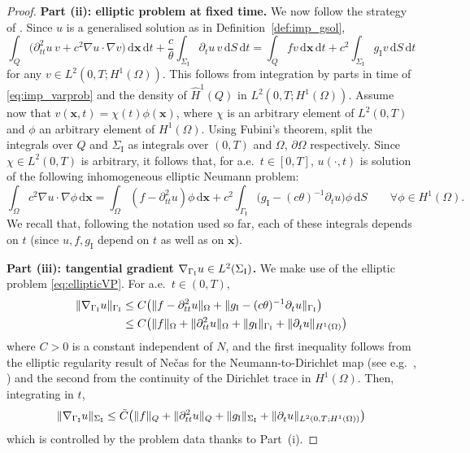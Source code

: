 \documentclass[a4paper]{article}
\theoremstyle{plain}
\theoremstyle{definition}
\newcommand{\dx}{{\,\mathrm{d}\vect x}}
\newcommand{\dt}{{\,\mathrm{d}t}}
\newcommand{\dS}{{\,\mathrm{d}S}}
\newcommand{\Grad}[1]{\nabla #1}
\newcommand{\TimeDer}{{\partial^{}_t}}
\newcommand{\SecondTimeDer}{{\partial^2_{tt}}}
\newcommand{\vect}[1]{\bm{#1}}
\newcommand{\GI}{{\Gamma_{\mathrm I}}}
\newcommand{\SI}{{\Sigma_{\mathrm I}}}
\newcommand{\gI}{{g_{\mathrm I}}}
\newcommand{\vx}{{\vect x}}
\newcommand{\GradGI}{{\Grad_{\GI}}}
\begin{document}
\begin{proof}
{\bf Part (ii): elliptic problem at fixed time. \;}
We now follow the strategy of \cite[Cor.~IV.4.1]{ladyzhenskaya-bvp}.
	Since $u$ is a generalised solution as in Definition~\ref{def:imp_gsol}, \begin{equation*}
    \int_Q \big(\SecondTimeDer{u}\, v + c^2 \Grad u \cdot \Grad v\big) \dx \dt + \frac{c}{\theta} \int_\SI \TimeDer{u}\, v \dS \dt
    = \int_Q f v \dx \dt + c^2 \int_\SI \gI v \dS \dt
	\end{equation*}
	for any $v \in L^2(0, T; H^1(\Omega))$.
	This follows from integration by parts in time of \eqref{eq:imp_varprob} and the density of $\widehat H^1(Q)$ in $L^2(0,T;H^1(\Omega))$.
Assume now that $v(\vx,t) = \chi(t) \phi(\vx)$, where $\chi$ is an arbitrary element of $L^2(0,T)$ and $\phi$ an arbitrary element of $H^1(\Omega)$. Using Fubini's theorem, split the integrals over $Q$ and $\SI$ as integrals over $(0,T)$ and $\Omega$, $\partial \Omega$ respectively. Since $\chi \in L^2(0,T)$ is arbitrary, it follows that, for a.e.~$t\in [0,T]$,
	$u(\cdot,t)$ is solution of the following inhomogeneous elliptic Neumann problem:
	\begin{equation}\label{eq:ellipticVP}
		\int_{\Omega} c^2 \Grad u \cdot \Grad \phi \dx
		= \int_{\Omega} (f - \SecondTimeDer{u})\phi \dx + c^2 \int_{\GI} \big(\gI - (c\theta)^{-1} \TimeDer{u}\big)\phi \dS
		\qquad \forall\phi\in H^1(\Omega).
	\end{equation}
	We recall that, following the notation used so far, each of these integrals depends on $t$ (since $u,f,\gI$ depend on $t$ as well as on $\vect x$).

	{\bf Part (iii): tangential gradient $\GradGI u\in L^2(\SI)$. \;}
	We make use of the elliptic problem \eqref{eq:ellipticVP}.
	For a.e.~$t\in(0,T)$,
	\begin{align*}
    \|\GradGI u\|_\GI
    &\le C \big(\|f-\SecondTimeDer u\|_\Omega+\|\gI-(c\theta)^{-1}\TimeDer u\|_\GI\big)\\
    &\le C \big(\|f\|_\Omega +\|\SecondTimeDer u\|_\Omega+ \|\gI\|_\GI + \|\TimeDer u\|_{H^1(\Omega)}\big)
	\end{align*}
	where $C>0$ is a constant independent of $N$, and the first inequality follows from the elliptic regularity result of Ne\v cas for the Neumann-to-Dirichlet map (see e.g.~\cite[sect.~5.2.1]{necas2011direct}, \cite[Thm.~4.24(ii)]{McLean00}) and the second from the continuity of the Dirichlet trace in $H^1(\Omega)$.
	Then, integrating in $t$,
	$$
	\|\GradGI u\|_\SI \le \tilde C \big(\|f\|_Q +\|\SecondTimeDer u\|_Q+ \|\gI\|_\SI + \|\TimeDer u\|_{L^2(0,T;H^1(\Omega))}\big)
	$$
	which is controlled by the problem data thanks to Part~(i).


\end{proof}
\end{document}
